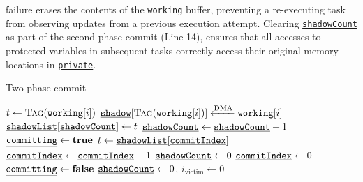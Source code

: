 failure erases the contents of the \texttt{working} buffer, preventing a re-executing task
from observing updates from a previous execution attempt.
Clearing \texttt{\underline{shadowCount}} as part of the second phase commit
(Line 14), ensures that all accesses to protected variables in subsequent tasks
correctly access their original memory locations in \texttt{\underline{private}}.\\
%
\begin{algorithm}[t]
	\caption{Two-phase commit}
	\label{algo:commit}
	\scriptsize
	\begin{algorithmic}[1]
         
                \State $t \gets \Call{Tag}{\texttt{working}[i]}$
                \State $\texttt{\underline{shadow}}[\Call{Tag}{\texttt{working}[i]}] \xleftarrow{\text{DMA}} \texttt{working}[i]$
                \State $\texttt{\underline{shadowList}}[\texttt{\underline{shadowCount}}] \gets t$
                \State $\texttt{\underline{shadowCount}} \gets \texttt{\underline{shadowCount}} + 1$
            \EndFor
            \State {}
        \EndProcedure
         
            \State $\texttt{\underline{committing}} \gets \textbf{true}$
                \State $t \gets \texttt{\underline{shadowList}}[\texttt{\underline{commitIndex}}]$
                \State {}
                \State $\texttt{\underline{commitIndex}} \gets \texttt{\underline{commitIndex}} + 1$
            \EndWhile
            \State $\texttt{\underline{shadowCount}} \gets 0$
            \State $\texttt{\underline{commitIndex}} \gets 0$
            \State $\texttt{\underline{committing}} \gets \textbf{false}$
        \EndProcedure
         
             
            \EndIf
            \State $\texttt{\underline{shadowCount}} \gets 0$, $i_\text{victim} \gets 0$
        \EndProcedure
	\end{algorithmic}
\end{algorithm}
%
